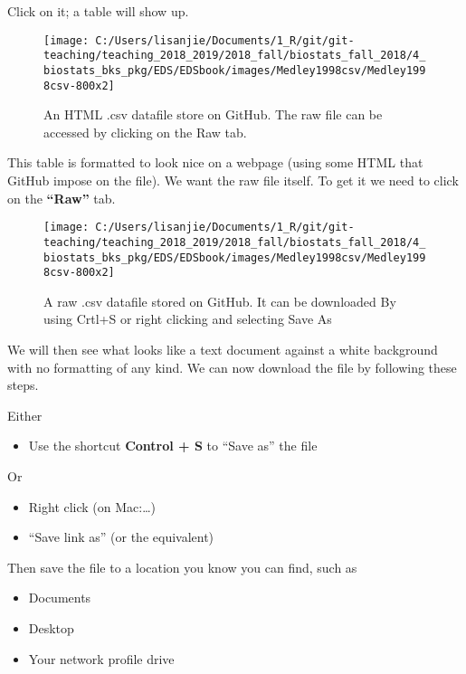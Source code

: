 \documentclass[]{book}
\providecommand{\tightlist}{%
  \setlength{\itemsep}{0pt}\setlength{\parskip}{0pt}}
\theoremstyle{definition}
\theoremstyle{definition}
\theoremstyle{definition}
\theoremstyle{remark}
\begin{document}
Click on it; a table will show up.

\begin{figure}
\texttt{[image: C:/Users/lisanjie/Documents/1\_R/git/git-teaching/teaching\_2018\_2019/2018\_fall/biostats\_fall\_2018/4\_biostats\_bks\_pkg/EDS/EDSbook/images/Medley1998csv/Medley1998csv-800x2]} \caption{An HTML .csv datafile store on GitHub.  The raw file can be accessed by clicking on the Raw tab.}\label{fig:unnamed-chunk-91}
\end{figure}

This table is formatted to look nice on a webpage (using some HTML that
GitHub impose on the file). We want the raw file itself. To get it we
need to click on the \textbf{``Raw''} tab.

\begin{figure}
\texttt{[image: C:/Users/lisanjie/Documents/1\_R/git/git-teaching/teaching\_2018\_2019/2018\_fall/biostats\_fall\_2018/4\_biostats\_bks\_pkg/EDS/EDSbook/images/Medley1998csv/Medley1998csv-800x2]} \caption{A raw .csv datafile stored on GitHub.  It can be downloaded By using Crtl+S or right clicking and selecting Save As}\label{fig:unnamed-chunk-92}
\end{figure}

We will then see what looks like a text document against a white
background with no formatting of any kind. We can now download the file
by following these steps.

Either

\begin{itemize}
\tightlist
\item
  Use the shortcut \textbf{Control + S} to ``Save as'' the file
\end{itemize}

Or

\begin{itemize}
\tightlist
\item
  Right click (on Mac:\ldots{})
\item
  ``Save link as'' (or the equivalent)
\end{itemize}

Then save the file to a location you know you can find, such as

\begin{itemize}
\tightlist
\item
  Documents
\item
  Desktop
\item
  Your network profile drive
\end{itemize}
\end{document}
